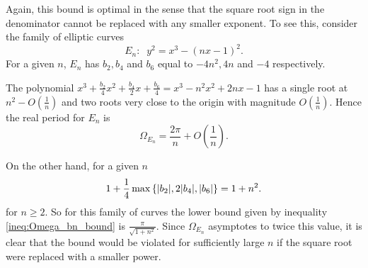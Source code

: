 Again, this bound is optimal in the sense that the square root sign in the denominator cannot be replaced with any smaller exponent. To see this, consider the family of elliptic curves
\begin{equation}
E_n: \;\; y^2 = x^3 - (nx-1)^2.
\end{equation}
For a given $n$, $E_n$ has $b_2,b_4$ and $b_6$ equal to $-4n^2,4n$ and $-4$ respectively.

The polynomial $x^3 + \frac{b_2}{4} x^2 + \frac{b_4}{2} x + \frac{b_6}{4} = x^3 -n^2 x^2 + 2n x - 1$ has a single root at $n^2 - O(\frac{1}{n})$ and two roots very close to the origin with magnitude $O(\frac{1}{n})$. Hence the real period for $E_n$ is
\begin{equation}
\Omega_{E_n} = \frac{2\pi}{n} + O\left(\frac{1}{n}\right).
\end{equation}

On the other hand, for a given $n$
\begin{equation}
1+\frac{1}{4}\max\left\{|b_2|,2|b_4|,|b_6|\right\} = 1+n^2.
\end{equation}
for $n\ge 2$. So for this family of curves the lower bound given by inequality \ref{ineq:Omega_bn_bound} is $\frac{\pi}{\sqrt{1+n^2}}$. Since $\Omega_{E_n}$ asymptotes to twice this value, it is clear that the bound would be violated for sufficiently large $n$ if the square root were replaced with a smaller power. \\

